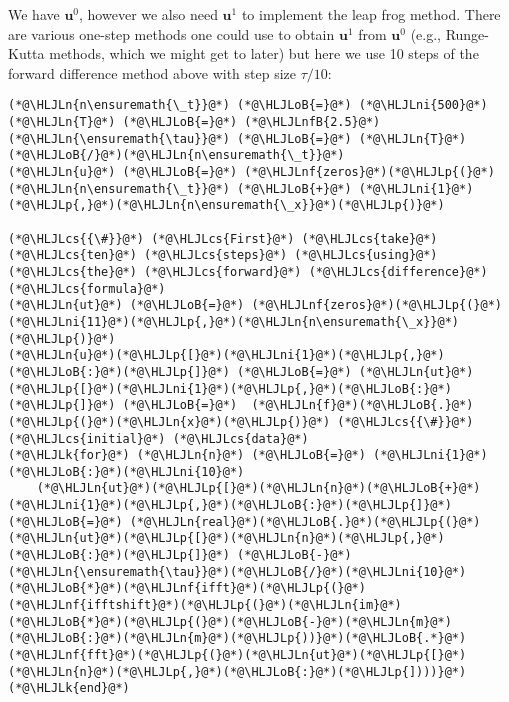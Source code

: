 \documentclass[12pt,landscape]{article}
\newcommand{\HLJLk}[1]{\textcolor[RGB]{148,91,176}{\textbf{#1}}}
\newcommand{\HLJLn}[1]{#1}
\newcommand{\HLJLnf}[1]{\textcolor[RGB]{66,102,213}{#1}}
\newcommand{\HLJLnfB}[1]{\textcolor[RGB]{59,151,46}{#1}}
\newcommand{\HLJLni}[1]{\textcolor[RGB]{59,151,46}{#1}}
\newcommand{\HLJLoB}[1]{\textcolor[RGB]{102,102,102}{\textbf{#1}}}
\newcommand{\HLJLp}[1]{#1}
\newcommand{\HLJLcs}[1]{\textcolor[RGB]{153,153,119}{\textit{#1}}}
\begin{document}
{We have $\mathbf{u}^0$, however we also need $\mathbf{u}^1$ to implement the leap frog method.  There are various one-step methods one could use to obtain $\mathbf{u}^1$ from $\mathbf{u}^0$ (e.g., Runge-Kutta methods, which we might get to later) but here we use 10 steps of the forward difference method above with step size $\tau/10$:


\begin{lstlisting}
(*@\HLJLn{n\ensuremath{\_t}}@*) (*@\HLJLoB{=}@*) (*@\HLJLni{500}@*)
(*@\HLJLn{T}@*) (*@\HLJLoB{=}@*) (*@\HLJLnfB{2.5}@*)
(*@\HLJLn{\ensuremath{\tau}}@*) (*@\HLJLoB{=}@*) (*@\HLJLn{T}@*)(*@\HLJLoB{/}@*)(*@\HLJLn{n\ensuremath{\_t}}@*)
(*@\HLJLn{u}@*) (*@\HLJLoB{=}@*) (*@\HLJLnf{zeros}@*)(*@\HLJLp{(}@*)(*@\HLJLn{n\ensuremath{\_t}}@*) (*@\HLJLoB{+}@*) (*@\HLJLni{1}@*)(*@\HLJLp{,}@*)(*@\HLJLn{n\ensuremath{\_x}}@*)(*@\HLJLp{)}@*)

(*@\HLJLcs{{\#}}@*) (*@\HLJLcs{First}@*) (*@\HLJLcs{take}@*) (*@\HLJLcs{ten}@*) (*@\HLJLcs{steps}@*) (*@\HLJLcs{using}@*) (*@\HLJLcs{the}@*) (*@\HLJLcs{forward}@*) (*@\HLJLcs{difference}@*) (*@\HLJLcs{formula}@*)
(*@\HLJLn{ut}@*) (*@\HLJLoB{=}@*) (*@\HLJLnf{zeros}@*)(*@\HLJLp{(}@*)(*@\HLJLni{11}@*)(*@\HLJLp{,}@*)(*@\HLJLn{n\ensuremath{\_x}}@*)(*@\HLJLp{)}@*)
(*@\HLJLn{u}@*)(*@\HLJLp{[}@*)(*@\HLJLni{1}@*)(*@\HLJLp{,}@*)(*@\HLJLoB{:}@*)(*@\HLJLp{]}@*) (*@\HLJLoB{=}@*) (*@\HLJLn{ut}@*)(*@\HLJLp{[}@*)(*@\HLJLni{1}@*)(*@\HLJLp{,}@*)(*@\HLJLoB{:}@*)(*@\HLJLp{]}@*) (*@\HLJLoB{=}@*)  (*@\HLJLn{f}@*)(*@\HLJLoB{.}@*)(*@\HLJLp{(}@*)(*@\HLJLn{x}@*)(*@\HLJLp{)}@*) (*@\HLJLcs{{\#}}@*) (*@\HLJLcs{initial}@*) (*@\HLJLcs{data}@*)
(*@\HLJLk{for}@*) (*@\HLJLn{n}@*) (*@\HLJLoB{=}@*) (*@\HLJLni{1}@*)(*@\HLJLoB{:}@*)(*@\HLJLni{10}@*)
    (*@\HLJLn{ut}@*)(*@\HLJLp{[}@*)(*@\HLJLn{n}@*)(*@\HLJLoB{+}@*)(*@\HLJLni{1}@*)(*@\HLJLp{,}@*)(*@\HLJLoB{:}@*)(*@\HLJLp{]}@*) (*@\HLJLoB{=}@*) (*@\HLJLn{real}@*)(*@\HLJLoB{.}@*)(*@\HLJLp{(}@*)(*@\HLJLn{ut}@*)(*@\HLJLp{[}@*)(*@\HLJLn{n}@*)(*@\HLJLp{,}@*)(*@\HLJLoB{:}@*)(*@\HLJLp{]}@*) (*@\HLJLoB{-}@*) (*@\HLJLn{\ensuremath{\tau}}@*)(*@\HLJLoB{/}@*)(*@\HLJLni{10}@*)(*@\HLJLoB{*}@*)(*@\HLJLnf{ifft}@*)(*@\HLJLp{(}@*)(*@\HLJLnf{ifftshift}@*)(*@\HLJLp{(}@*)(*@\HLJLn{im}@*)(*@\HLJLoB{*}@*)(*@\HLJLp{(}@*)(*@\HLJLoB{-}@*)(*@\HLJLn{m}@*)(*@\HLJLoB{:}@*)(*@\HLJLn{m}@*)(*@\HLJLp{))}@*)(*@\HLJLoB{.*}@*)(*@\HLJLnf{fft}@*)(*@\HLJLp{(}@*)(*@\HLJLn{ut}@*)(*@\HLJLp{[}@*)(*@\HLJLn{n}@*)(*@\HLJLp{,}@*)(*@\HLJLoB{:}@*)(*@\HLJLp{])))}@*)
(*@\HLJLk{end}@*)


\end{lstlisting}}
\end{document}
